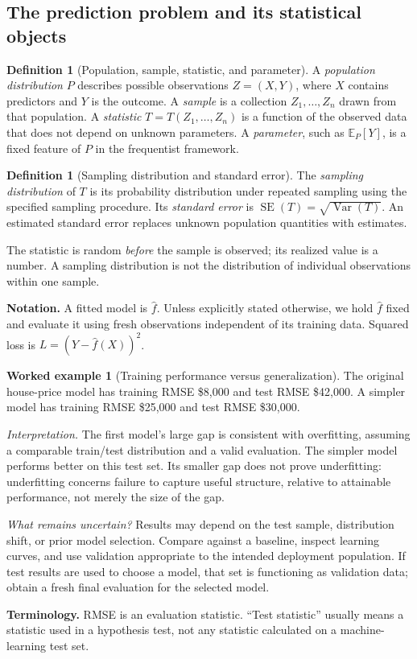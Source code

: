 \documentclass[11pt,letterpaper]{article}
\newcommand{\E}{\mathbb E}
\newcommand{\Var}{\operatorname{Var}}
\newcommand{\SE}{\operatorname{SE}}
\theoremstyle{definition}
\newtheorem{definition}[theorem]{Definition}
\newtheorem{example}[theorem]{Worked example}
\theoremstyle{remark}
\numberwithin{equation}{section}
\begin{document}
\subsection{The prediction problem and its statistical objects}
\begin{definition}[Population, sample, statistic, and parameter]
A \emph{population distribution} $P$ describes possible observations $Z=(X,Y)$,
where $X$ contains predictors and $Y$ is the outcome. A \emph{sample} is a
collection $Z_1,\ldots,Z_n$ drawn from that population. A \emph{statistic}
$T=T(Z_1,\ldots,Z_n)$ is a function of the observed data that does not depend
on unknown parameters. A \emph{parameter}, such as $\E_P[Y]$, is a fixed
feature of $P$ in the frequentist framework.
\end{definition}
\begin{definition}[Sampling distribution and standard error]
The \emph{sampling distribution} of $T$ is its probability distribution under
repeated sampling using the specified sampling procedure. Its \emph{standard
error} is $\SE(T)=\sqrt{\Var(T)}$. An estimated standard error replaces unknown
population quantities with estimates.
\end{definition}
The statistic is random \emph{before} the sample is observed; its realized value
is a number. A sampling distribution is not the distribution of individual
observations within one sample.

\textbf{Notation.} A fitted model is $\hat f$. Unless explicitly stated otherwise,
we hold $\hat f$ fixed and evaluate it using fresh observations independent of
its training data. Squared loss is $L=(Y-\hat f(X))^2$.

\begin{example}[Training performance versus generalization]
The original house-price model has training RMSE \$8,000 and test RMSE \$42,000.
A simpler model has training RMSE \$25,000 and test RMSE \$30,000.

\emph{Interpretation.} The first model's large gap is consistent with overfitting,
assuming a comparable train/test distribution and a valid evaluation. The simpler
model performs better on this test set. Its smaller gap does not prove underfitting:
underfitting concerns failure to capture useful structure, relative to attainable
performance, not merely the size of the gap.

\emph{What remains uncertain?} Results may depend on the test sample, distribution
shift, or prior model selection. Compare against a baseline, inspect learning
curves, and use validation appropriate to the intended deployment population.
If test results are used to choose a model, that set is functioning as validation
data; obtain a fresh final evaluation for the selected model.
\end{example}
\textbf{Terminology.} RMSE is an evaluation statistic. ``Test statistic'' usually
means a statistic used in a hypothesis test, not any statistic calculated on a
machine-learning test set.
\newpage
\end{document}
